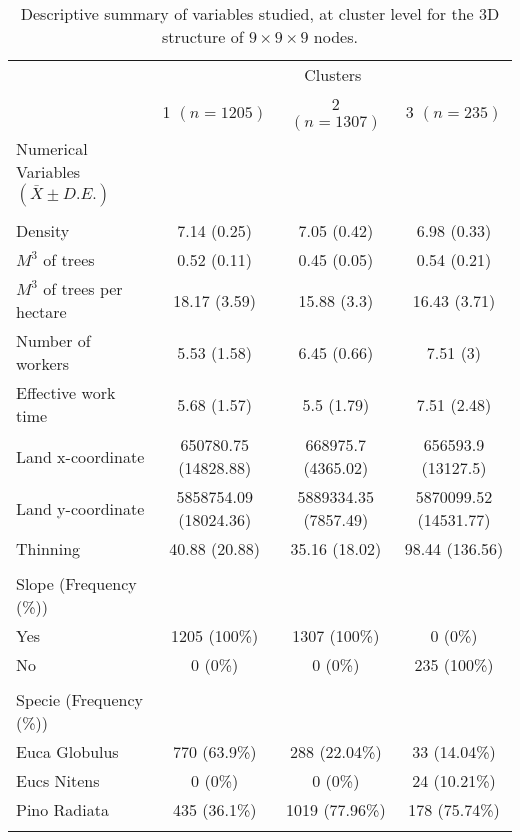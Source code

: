 \documentclass[conference]{IEEEtran}
\begin{document}



\onecolumn
\appendix 

\begin{table}[htpb]
\renewcommand{\arraystretch}{1.3}
\caption{Descriptive summary of variables studied, at cluster level for the 3D structure of $9\times9\times9$ nodes.}
\label{table10}

\centering

\begin{tabular}{l || c c c}

& \multicolumn{3}{c}{Clusters} \\ 
& 1 $(n = 1205)$	& 2 $(n = 1307)$	& 3 $(n = 235)$ \\

\hline
\hline

Numerical Variables  $(\bar{X}\pm D.E.)$ \\
\\
Density & 7.14 (0.25) & 7.05 (0.42) & 6.98 (0.33) \\ 
$M^3$ of trees & 0.52 (0.11) & 0.45 (0.05) & 0.54 (0.21) \\ 
$M^3$ of trees per hectare & 18.17 (3.59) & 15.88 (3.3) & 16.43 (3.71) \\ 
Number of workers & 5.53 (1.58) & 6.45 (0.66) & 7.51 (3) \\ 
Effective work time & 5.68 (1.57) & 5.5 (1.79) & 7.51 (2.48) \\ 
Land x-coordinate & 650780.75 (14828.88) & 668975.7 (4365.02) & 656593.9 (13127.5) \\ 
Land y-coordinate & 5858754.09 (18024.36) & 5889334.35 (7857.49) & 5870099.52 (14531.77) \\ 
Thinning & 40.88 (20.88) & 35.16 (18.02) & 98.44 (136.56) \\ 
\\
Slope (Frequency (\%)) &  &  &  \\ 
Yes & 1205 (100\%) & 1307 (100\%) & 0 (0\%) \\ 
No & 0 (0\%) & 0 (0\%) & 235 (100\%) \\ 
\\
Specie (Frequency (\%)) &  &  &  \\ 
Euca Globulus & 770 (63.9\%) & 288 (22.04\%) & 33 (14.04\%) \\ 
Eucs Nitens & 0 (0\%) & 0 (0\%) & 24 (10.21\%) \\ 
Pino Radiata & 435 (36.1\%) & 1019 (77.96\%) & 178 (75.74\%) \\ 
\\

\end{tabular}
\end{table}
\end{document}
